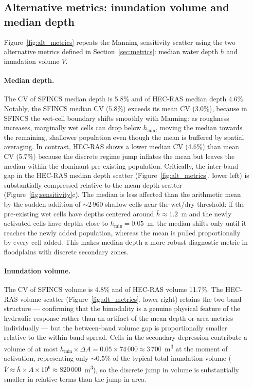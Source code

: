 \documentclass[review,12pt]{elsarticle}
\newcommand{\sfincs}{\textsc{SFINCS}}
\newcommand{\hecras}{\textsc{HEC-RAS}}
\begin{document}
\subsection{Alternative metrics: inundation volume and median depth}
\label{sec:alt_metrics}

Figure~\ref{fig:alt_metrics} repeats the Manning sensitivity scatter using
the two alternative metrics defined in Section~\ref{sec:metrics}: median
water depth $\tilde{h}$ and inundation volume $V$.

\paragraph{Median depth.}
The CV of \sfincs{} median depth is 5.8\% and of \hecras{} median depth 4.6\%.
Notably, the \sfincs{} median CV (5.8\%) exceeds its mean CV (3.0\%),
because in \sfincs{} the wet-cell boundary shifts smoothly with Manning:
as roughness increases, marginally wet cells can drop below $h_{\min}$,
moving the median towards the remaining, shallower population even though
the mean is buffered by spatial averaging.
In contrast, \hecras{} shows a lower median CV (4.6\%) than mean CV (5.7\%)
because the discrete regime jump inflates the mean but leaves the median
within the dominant pre-existing population.
Critically, the inter-band gap in the \hecras{} median depth scatter
(Figure~\ref{fig:alt_metrics}, lower left) is substantially compressed
relative to the mean depth scatter (Figure~\ref{fig:sensitivity}c).
The median is less affected than the arithmetic mean by the sudden addition
of $\sim$2\,960 shallow cells near the wet/dry threshold: if the pre-existing
wet cells have depths centered around $\bar{h} \approx 1.2$~m and the
newly activated cells have depths close to $h_{\min} = 0.05$~m, the median
shifts only until it reaches the newly added population, whereas the mean
is pulled proportionally by every cell added.
This makes median depth a more robust diagnostic metric in floodplains with
discrete secondary zones.

\paragraph{Inundation volume.}
The CV of \sfincs{} volume is 4.8\% and of \hecras{} volume 11.7\%.
The \hecras{} volume scatter (Figure~\ref{fig:alt_metrics}, lower right)
retains the two-band structure --- confirming that the bimodality is a genuine
physical feature of the hydraulic response rather than an artifact of the
mean-depth or area metrics individually --- but the between-band volume gap
is proportionally smaller relative to the within-band spread.
Cells in the secondary depression contribute a volume of at most
$h_{\min} \times \Delta A = 0.05 \times 74\,000 \approx 3\,700$~m\textsuperscript{3}
at the moment of activation, representing only $\sim$0.5\% of the typical
total inundation volume ($\bar{V} \approx \bar{h} \times A \times 10^6
\approx 820\,000$~m\textsuperscript{3}), so the discrete jump in volume is
substantially smaller in relative terms than the jump in area.
\end{document}
